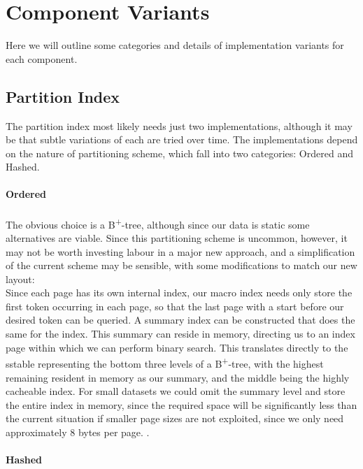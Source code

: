 \documentclass[fleqn]{article}
\begin{document}
\clearpage
\section{Component Variants}
Here we will outline some categories and details of implementation variants for each component.

\subsection{Partition Index}
The partition index most likely needs just two implementations, although it may be that subtle variations
of each are tried over time. The implementations depend on the nature of partitioning scheme, which
fall into two categories: Ordered and Hashed.
\paragraph{Ordered}
\paragraph{}
    The obvious choice is a B\textsuperscript{+}-tree, although since our data is static some alternatives are viable.
    Since this partitioning scheme is uncommon, however, it may not be worth investing labour in a major new 
    approach, and a simplification of the current scheme may be sensible, with some modifications to match our
    new layout:
    \\
    Since each page has its own internal index, our macro index needs only store the first token occurring in each
    page, so that the last page with a start before our desired token can be queried. A summary index can be 
    constructed that does the same for the index. This summary can reside in memory, directing us to an index
    page within which we can perform binary search. This translates directly to the sstable representing the 
    bottom three levels of a B\textsuperscript{+}-tree, with the highest remaining resident in memory as our 
    summary, and the middle being the highly cacheable index. For small datasets we could omit the summary level
    and store the entire index in memory, since the required space will be significantly less than the current
    situation if smaller page sizes are not exploited, since we only need approximately 8 bytes per page.
    .
\paragraph{Hashed}
\end{document}

